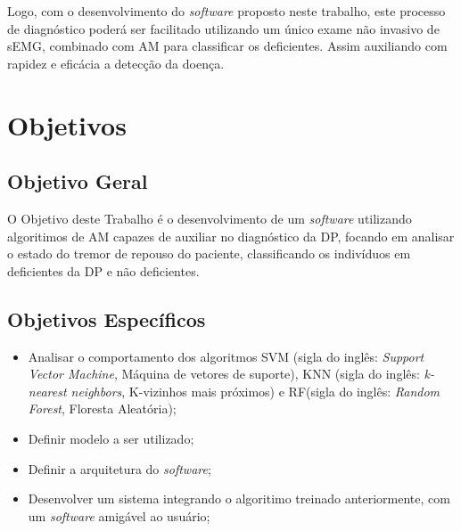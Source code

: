 Logo, com o desenvolvimento do \textit{software} proposto neste trabalho, este processo de diagnóstico poderá ser facilitado utilizando um único exame não invasivo de sEMG, combinado com AM para classificar os deficientes. Assim auxiliando com rapidez e eficácia a detecção da doença. 

\section{Objetivos} 
\subsection{Objetivo Geral} 
O Objetivo deste Trabalho é o desenvolvimento de um \textit{software} utilizando algoritimos de AM capazes de auxiliar no diagnóstico da DP, focando em analisar o estado do tremor de repouso do paciente, classificando os indivíduos em deficientes da DP e não deficientes. 

\subsection{Objetivos Específicos}
\begin{itemize}
    \item Analisar o comportamento dos algoritmos SVM (sigla do inglês: \textit{Support Vector Machine}, Máquina de vetores de suporte), KNN (sigla do inglês: \textit{k-nearest neighbors}, K-vizinhos mais próximos) e RF(sigla do inglês: \textit{Random Forest}, Floresta Aleatória);
    \item Definir modelo a ser utilizado;
    \item Definir a arquitetura do \textit{software};
    \item Desenvolver um sistema integrando o algoritimo treinado anteriormente, com um \textit{software} amigável ao usuário;
\end{itemize}